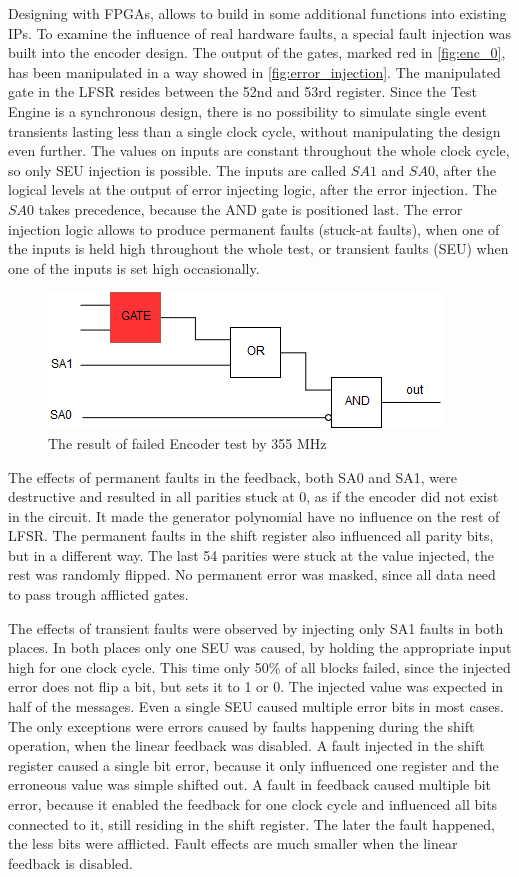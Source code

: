 Designing with FPGAs, allows to build in some additional functions into existing IPs. To examine the influence of real hardware faults, a special fault injection was built into the encoder design. The output of the gates, marked red in \autoref{fig:enc_0}, has been manipulated in a way showed in \autoref{fig:error_injection}. The manipulated gate in the LFSR resides between the 52nd and 53rd register. Since the Test Engine is a synchronous design, there is no possibility to simulate single event transients lasting less than a single clock cycle, without manipulating the design even further. The values on inputs are constant throughout the whole clock cycle, so only SEU injection is possible. The inputs are called $SA1$ and $SA0$, after the logical levels at the output of error injecting logic, after the error injection. The $SA0$ takes precedence, because the AND gate is positioned last. The error injection logic allows to produce permanent faults (stuck-at faults), when one of the inputs is held high throughout the whole test, or transient faults (SEU) when one of the inputs is set high occasionally.

\begin{figure}[h]
\centering
\includegraphics[width=.5\textwidth]{figures/error_injection.png}
\caption{The result of failed Encoder test by 355 MHz}
\label{fig:error_injection}
\end{figure}

The effects of permanent faults in the feedback, both SA0 and SA1, were destructive and resulted in all parities stuck at 0, as if the encoder did not exist in the circuit. It made the generator polynomial have no influence on the rest of LFSR. The permanent faults in the shift register also influenced all parity bits, but in a different way. The last 54 parities were stuck at the value injected, the rest was randomly flipped. No permanent error was masked, since all data need to pass trough afflicted gates.

The effects of transient faults were observed by injecting only SA1 faults in both places. In both places only one SEU was caused, by holding the appropriate input high for one clock cycle. This time only 50\% of all blocks failed, since the injected error does not flip a bit, but sets it to 1 or 0. The injected value was expected in half of the messages. Even a single SEU caused multiple error bits in most cases. The only exceptions were errors caused by faults happening during the shift operation, when the linear feedback was disabled. A fault injected in the shift register caused a single bit error, because it only influenced one register and the erroneous value was simple shifted out. A fault in feedback caused multiple bit error, because it enabled the feedback for one clock cycle and influenced all bits connected to it, still residing in the shift register. The later the fault happened, the less bits were afflicted. Fault effects are much smaller when the linear feedback is disabled.


